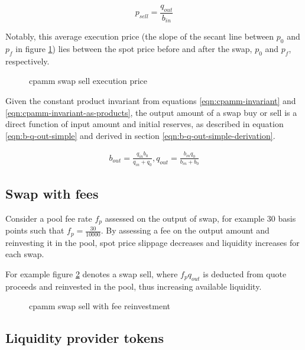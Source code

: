 \documentclass[table, twocolumn]{article}
\begin{document}
\begin{equation} \label{eqn:cpamm-avg-execution-price}
  p_{sell} = \frac{q_{out}}{b_{in}}
\end{equation}

Notably, this average execution price (the slope of the secant line between $p_0$ and
$p_f$ in figure \ref{fig:cpamm-swap-sell-price}) lies between the spot price before and
after the swap, $p_0$ and $p_f$, respectively.

\begin{figure}[!htb]
  \centering
  
  \caption{\gls{cpamm} swap sell execution price}
  \label{fig:cpamm-swap-sell-price}
\end{figure}

Given the constant product invariant from equations \ref{eqn:cpamm-invariant} and
\ref{eqn:cpamm-invariant-as-products}, the output amount of a swap buy or sell is a
direct function of input amount and initial reserves, as described in equation
\ref{eqn:b-q-out-simple} and derived in section \ref{eqn:b-q-out-simple-derivation}.

\begin{align} \label{eqn:b-q-out-simple}
  b_{out} = \frac{q_{in} b_0}{q_{in} + q_0}, q_{out} = \frac{b_{in} q_0}{b_{in} + b_0}
\end{align}

\subsection{Swap with fees}

Consider a pool fee rate $f_p$ assessed on the output of swap, for example 30 basis
points such that $f_p = \frac{30}{10000}$. By assessing a fee on the output amount and
reinvesting it in the pool, spot price slippage decreases and liquidity increases for
each swap.

For example figure \ref{fig:cpamm-swap-sell-with-fee} denotes a swap sell, where
$f_p q_{out}$ is deducted from quote proceeds and reinvested in the pool, thus
increasing available liquidity.

\begin{figure}[!htb]
  \centering
  
  \caption{\gls{cpamm} swap sell with fee reinvestment}
  \label{fig:cpamm-swap-sell-with-fee}
\end{figure}

\subsection{Liquidity provider tokens}
\end{document}
